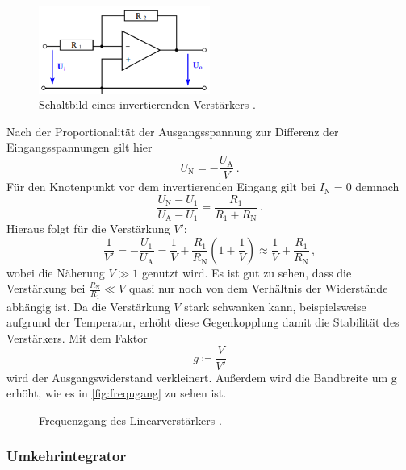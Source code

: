 \begin{figure}
    \centering
    \includegraphics[width=0.5\textwidth]{invertierend.png}
    \caption{Schaltbild eines invertierenden Verstärkers \cite{ap51}.}
    \label{fig:verstaerker}
\end{figure}

\noindent
Nach der Proportionalität der Ausgangsspannung zur Differenz der Eingangsspannungen gilt hier 
\begin{equation}
    U_\text{N} = - \frac{U_\text{A}}{V}\, .
\end{equation}
Für den Knotenpunkt vor dem invertierenden Eingang gilt bei $I_\text{N} = 0$ demnach 
\begin{equation*}
    \frac{U_\text{N} - U_1}{U_\text{A} - U_1} = \frac{R_1}{R_1 + R_\text{N}}\, .
\end{equation*}
Hieraus folgt für die Verstärkung $V'$: 
\begin{equation*}
    \frac{1}{V'} = - \frac{U_1}{U_\text{A}} = \frac{1}{V} + \frac{R_1}{R_\text{N}}\left(1 + \frac{1}{V}\right) \approx \frac{1}{V} + \frac{R_1}{R_\text{N}}\, ,
\end{equation*}
wobei die Näherung $V\gg 1$ genutzt wird. Es ist gut zu sehen, dass die Verstärkung bei $\frac{R_\text{N}}{R_1} \ll V$ quasi nur noch von dem Verhältnis der Widerstände abhängig ist. Da die Verstärkung $V$ stark schwanken kann, beispielsweise aufgrund der Temperatur, erhöht diese Gegenkopplung damit die Stabilität des Verstärkers. Mit dem Faktor 
\begin{equation*}
    g \coloneq \frac{V}{V'}
\end{equation*}
wird der Ausgangswiderstand verkleinert. Außerdem wird die Bandbreite um g erhöht, wie es in \autoref{fig:frequgang} zu sehen ist.
 
        


\begin{figure}[H]
    \centering
    \caption{Frequenzgang des Linearverstärkers \cite{V51_old}.}
    \label{fig:frequgang}
\end{figure}

\subsubsection{Umkehrintegrator}

